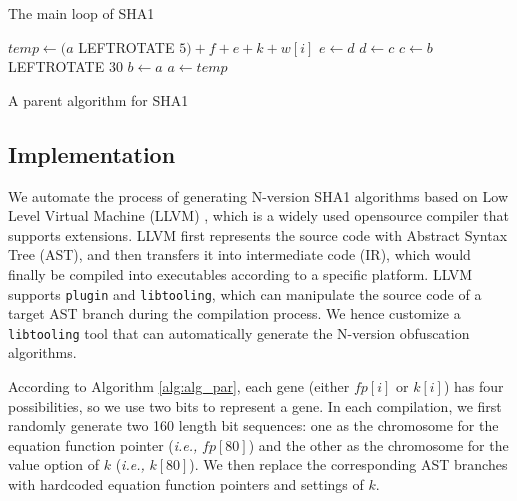 \documentclass[10pt, conference]{IEEEtran}
\begin{document}
\begin{algorithm} [th]
\label{alg:ori_sha1}
\caption{The main loop of SHA1}
\small
{}	{
	$temp \gets (a$ LEFTROTATE $5) + f + e + k + w[i]$\;
	$e \gets d $\;
	$d \gets c $\;
	$c \gets b$ LEFTROTATE $30$ \;
	$b \gets a $\;
	$a \gets temp $\;
}
\end{algorithm}

\begin{algorithm} [th]
\label{alg:alg_par}
\caption{A parent algorithm for SHA1}
\small
{}

\end{algorithm}

\subsection{Implementation}
We automate the process of generating N-version SHA1 algorithms based on Low Level Virtual Machine (LLVM) \cite{llvm}, which is a widely used opensource compiler that supports extensions.  LLVM first represents the source code with Abstract Syntax Tree (AST), and then transfers it into intermediate code (IR), which would finally be compiled into executables according to a specific platform.  LLVM supports \texttt{plugin} and \texttt{libtooling}, which can manipulate the source code of a target AST branch during the compilation process.  We hence customize a \texttt{libtooling} tool that can automatically generate the N-version obfuscation algorithms.  

According to Algorithm \ref{alg:alg_par}, each gene (either $fp[i]$ or $k[i]$) has four possibilities, so we use two bits to represent a gene.  In each compilation, we first randomly generate two 160 length bit sequences: one as the chromosome for the equation function pointer (\textit{i.e.,} $fp[80]$) and the other as the chromosome for the value option of $k$ (\textit{i.e.,} $k[80]$).  We then replace the corresponding AST branches with hardcoded equation function pointers and settings of $k$.  
\end{document}
